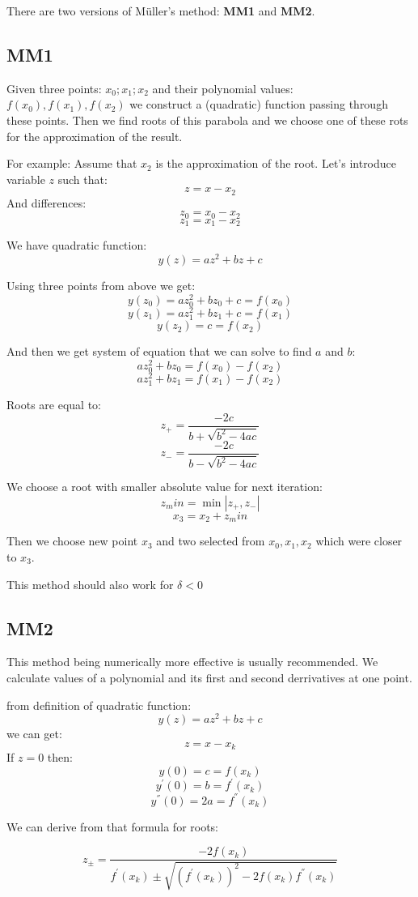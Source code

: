 \documentclass[12pt]{report}
\begin{document}
There are two versions of M{\"u}ller's method: \textbf{MM1} and \textbf{MM2}.

\subsection{MM1}
Given three points: $x_0; x_1; x_2$ and their polynomial values: $f(x_0), f(x_1), f(x_2)$ we construct a (quadratic) function passing through these points. Then we find roots of this parabola and we choose one of these rots for the approximation of the result.

For example:
Assume that $x_2$ is the approximation of the root.
Let's introduce variable $z$ such that:
\[ z = x - x_2 \]
And differences:
\[ z_0 = x_0 - x_2 \]
\[ z_1 = x_1 - x_2 \]

We have quadratic function:
\[ y(z) = az^2 + bz + c \]

Using three points from above we get:
\[ y(z_0) = az_0^2 + bz_0 + c = f(x_0) \]
\[ y(z_1) = az_1^2 + bz_1 + c = f(x_1) \]
\[ y(z_2) = c = f(x_2) \]

And then we get system of equation that we can solve to find $a$ and $b$:
\[ az_0^2 + bz_0 = f(x_0) - f(x_2) \]
\[ az_1^2 + bz_1 = f(x_1) - f(x_2) \]

Roots are equal to:
\[ z_+ = \frac{-2c}{b+\sqrt{b^2 - 4ac}} \]
\[ z_- = \frac{-2c}{b-\sqrt{b^2 - 4ac}} \]

We choose a root with smaller absolute value for next iteration:
\[ z_min = \min{|z_+, z_-|} \]
\[ x_3 = x_2 + z_min \]

Then we choose new point $x_3$ and two selected from $x_0, x_1, x_2$ which were closer to $x_3$.

This method should also work for $\delta < 0 $


\subsection{MM2}
This method being numerically more effective is usually recommended.
We calculate values of a polynomial and its first and second derrivatives at one point.

from definition of quadratic function:
\[ y(z) = az^2 + bz + c \]
we can get:
\[ z = x - x_k \]
If $z = 0$ then:
\[ y(0) = c = f(x_k) \]
\[ y^{'}(0) = b = f^{'}(x_k) \]
\[ y^{''}(0) = 2a = f^{''}(x_k) \]

We can derive from that formula for roots:

\[ z_{\pm} = \frac{-2f(x_k)}{f^{'}(x_k) \pm \sqrt{ (f^{'}(x_k))^2 - 2f(x_k)f^{''}(x_k)}}\]
\end{document}
